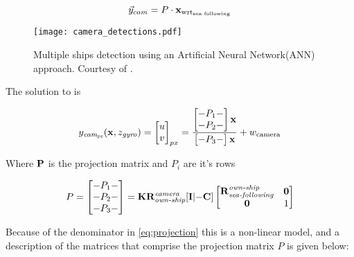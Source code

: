 \begin{equation}\label{eq:projection_model}
\vec{{{y}}}_{cam} = P \cdot \mathbf{x}_{\text{wrt}_{\text{sea following}}}
\end{equation}


\begin{figure}
	\centering
	\texttt{[image: camera\_detections.pdf]}
	\caption{Multiple ships detection using an Artificial Neural Network(ANN) approach. Courtesy of \cite{Blanke2020}.}
	\label{fig:multipleobjectdetections}
\end{figure}



 

The solution to  is
 

\begin{equation}
{{y}}_{\textit{cam}_{\textit{px}}}(\mathbf{x},z_{\textit{gyro}}) = \begin{bmatrix}u\\v\end{bmatrix}_{px}= \frac{\begin{bmatrix}-P_1-\\-P_2-\end{bmatrix}\mathbf{x}}{
	\begin{bmatrix}
	-P_3-
	\end{bmatrix}
	\mathbf{x}}+ {w}_{\text{camera}}
\end{equation}


Where $\mathbf{P}$ is the projection matrix and $P_{i}$ are it's rows

\begin{equation} \label{eq:projection}
P = \begin{bmatrix}-P_1- \\-P_2-\\-P_3- \end{bmatrix} = \mathbf{K}\mathbf{R_{\textit{own-ship}}^{\textit{camera}}}[\mathbf{I} | \mathbf{-C}]
\begin{bmatrix}
\mathbf{\mathbf{R}_{\textit{sea-following}}^{\textit{own-ship}}} &\mathbf{0}\\
\mathbf{0} &1
\end{bmatrix}
\end{equation}

Because of the denominator in \cref{eq:projection} this is a non-linear model, and a description of the matrices that comprise the projection matrix $P$ is given below:

